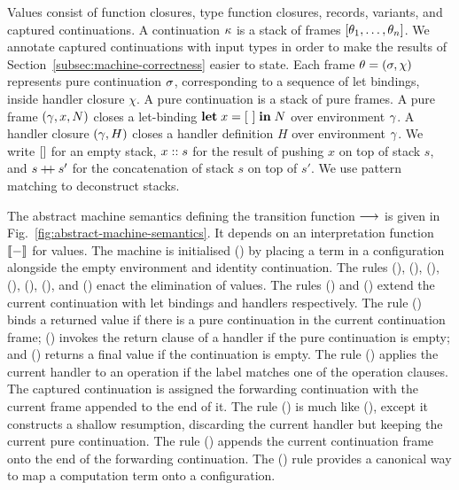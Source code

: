 \documentclass[12pt,phd,lfcs,twoside,openright,logo,leftchapter,normalheadings]{infthesis}
\theoremstyle{plain}
\theoremstyle{definition}
\begin{document}
Values consist of function closures, type function closures, records,
variants, and captured continuations.
%
A continuation $\kappa$ is a stack of frames $[\theta_1, \dots,
\theta_n]$. We annotate captured continuations with input types in order
to make the results of Section~\ref{subsec:machine-correctness} easier
to state. Each frame $\theta = (\sigma, \chi)$ represents pure
continuation $\sigma$, corresponding to a sequence of let bindings,
inside handler closure $\chi$.
%
A pure continuation is a stack of pure frames. A pure frame $(\gamma, x,
N)$ closes a let-binding $\mathbf{let} \;x=[~] \;\mathbf{in}\;N$ over environment
$\gamma$. A handler closure $(\gamma, H)$ closes a handler definition $H$
over environment $\gamma$.
%
We write $[]$ for an empty stack, $x :: s$ for the result of
pushing $x$ on top of stack $s$, and $s \mathbin{+\!\!+} s'$ for the
concatenation of stack $s$ on top of $s'$. We use pattern matching to
deconstruct stacks.

The abstract machine semantics defining the transition function $\longrightarrow$ is given in
Fig.~\ref{fig:abstract-machine-semantics}.
%
It depends on an interpretation function $\val{-}$ for values.
%
The machine is initialised () by placing a term in a
configuration alongside the empty environment and identity
continuation.
%
The rules (), (), (),
(), (), (), and
() enact the elimination of values.
%
The rules () and () extend the current
continuation with let bindings and handlers respectively.
%
The rule () binds a returned value if there is a pure
continuation in the current continuation frame;
%
() invokes the return clause of a handler if the pure
continuation is empty; and () returns a final value if
the continuation is empty.
%
The rule () applies the current handler to an operation if
the label matches one of the operation clauses. The captured
continuation is assigned the forwarding continuation with the current
frame appended to the end of it.
%
The rule () is much like (), except it
constructs a shallow resumption, discarding the current handler but
keeping the current pure continuation.
%
The rule () appends the current continuation
frame onto the end of the forwarding continuation.
%
The () rule provides a canonical way to map a computation
term onto a configuration.
\end{document}

